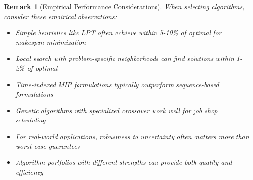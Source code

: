 \documentclass{article}
\newtheorem{remark}{Remark}
\theoremstyle{definition}
\begin{document}
\begin{remark}[Empirical Performance Considerations]
When selecting algorithms, consider these empirical observations:
\begin{itemize}
    \item Simple heuristics like LPT often achieve within 5-10\% of optimal for makespan minimization
    \item Local search with problem-specific neighborhoods can find solutions within 1-2\% of optimal
    \item Time-indexed MIP formulations typically outperform sequence-based formulations
    \item Genetic algorithms with specialized crossover work well for job shop scheduling
    \item For real-world applications, robustness to uncertainty often matters more than worst-case guarantees
    \item Algorithm portfolios with different strengths can provide both quality and efficiency
\end{itemize}
\end{remark}
\end{document}

